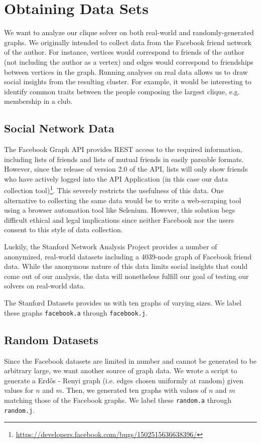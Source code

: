 \documentclass[]{article}
\begin{document}
	\section{Obtaining Data Sets}
	We want to analyze our clique solver on both real-world and randomly-generated graphs. We originally intended to collect data from the Facebook friend network of the author. For instance, vertices would correspond to friends of the author (not including the author as a vertex) and edges would correspond to friendships between vertices in the graph. Running analyses on real data allows us to draw social insights from the resulting cluster. For example, it would be interesting to identify common traits between the people composing the largest clique, e.g. membership in a club.
	
	\subsection{Social Network Data}
	The Facebook Graph API provides REST access to the required information, including lists of friends and lists of mutual friends in easily parsable formats. However, since the release of version 2.0 of the API, lists will only show friends who have actively logged into the API Application (in this case our data collection tool)\footnote{\url{https://developers.facebook.com/bugs/1502515636638396/}}. This severely restricts the usefulness of this data. One alternative to collecting the same data would be to write a web-scraping tool using a browser automation tool like Selenium. However, this solution begs difficult ethical and legal implications since neither Facebook nor the users consent to this style of data collection.
	
	Luckily, the Stanford Network Analysis Project provides a number of anonymized, real-world datasets including a 4039-node graph of Facebook friend data. While the anonymous nature of this data limits social insights that could come out of our analysis, the data will nonetheless fulfill our goal of testing our solvers on real-world data.
	
	The Stanford Datasets provides us with ten graphs of varying sizes. We label these graphs \texttt{facebook.a} through \texttt{facebook.j}.
	
	\subsection{Random Datasets}
	Since the Facebook datasets are limited in number and cannot be generated to be arbitrary large, we want another source of graph data. We wrote a script to generate a Erdős - Renyi graph (i.e. edges chosen uniformly at random) given values for $n$ and $m$. Then, we generated ten graphs with values of $n$ and $m$ matching those of the Facebook graphs. We label these \texttt{random.a} through \texttt{random.j}.
	
\end{document}
